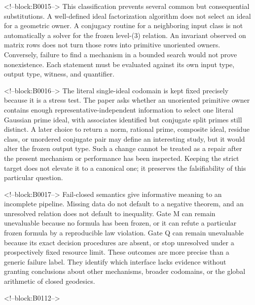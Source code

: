 \documentclass[11pt,a4paper]{article}
\begin{document}
<!--block:B0015-->
This classification prevents several common but consequential substitutions. A well-defined ideal factorization algorithm does not select an ideal for a geometric owner. A conjugacy routine for a neighboring input class is not automatically a solver for the frozen level-(3) relation. An invariant observed on matrix rows does not turn those rows into primitive unoriented owners. Conversely, failure to find a mechanism in a bounded search would not prove nonexistence. Each statement must be evaluated against its own input type, output type, witness, and quantifier.

<!--block:B0016-->
The literal single-ideal codomain is kept fixed precisely because it is a stress test. The paper asks whether an unoriented primitive owner contains enough representative-independent information to select one literal Gaussian prime ideal, with associates identified but conjugate split primes still distinct. A later choice to return a norm, rational prime, composite ideal, residue class, or unordered conjugate pair may define an interesting study, but it would alter the frozen output type. Such a change cannot be treated as a repair after the present mechanism or performance has been inspected. Keeping the strict target does not elevate it to a canonical one; it preserves the falsifiability of this particular question.

<!--block:B0017-->
Fail-closed semantics give informative meaning to an incomplete pipeline. Missing data do not default to a negative theorem, and an unresolved relation does not default to inequality. Gate M can remain unevaluable because no formula has been frozen, or it can refute a particular frozen formula by a reproducible law violation. Gate Q can remain unevaluable because its exact decision procedures are absent, or stop unresolved under a prospectively fixed resource limit. These outcomes are more precise than a generic failure label. They identify which interface lacks evidence without granting conclusions about other mechanisms, broader codomains, or the global arithmetic of closed geodesics.

<!--block:B0112-->
\end{document}
